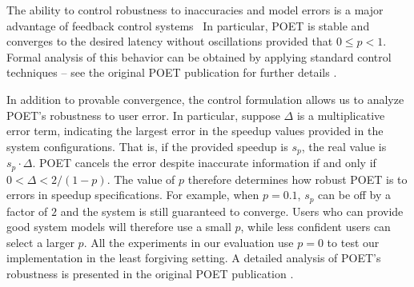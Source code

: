 The ability to control robustness to inaccuracies and model errors is a major advantage of feedback control systems~\cite{ICSE2014}
In particular, POET is stable and converges to the desired latency without oscillations provided that $0 \le p < 1$.
Formal analysis of this behavior can be obtained by applying standard control techniques -- see the original POET publication for further details \cite{POET}.

In addition to provable convergence, the control formulation allows us to analyze POET's robustness to user error.
In particular, suppose $\Delta$ is a multiplicative error term, indicating the largest error in the speedup values provided in the system configurations.
That is, if the provided speedup is $s_p$, the real value is $s_p \cdot \Delta$.
POET cancels the error despite inaccurate information if and only if $0 < \Delta < 2/(1-p)$.
The value of $p$ therefore determines how robust POET is to errors in speedup specifications.
For example, when $p = 0.1$, $s_p$ can be off by a factor of $2$ and the system is still guaranteed to converge.
Users who can provide good system models will therefore use a small $p$, while less confident users can select a larger $p$.
All the experiments in our evaluation use $p=0$ to test our implementation in the least forgiving setting.
A detailed analysis of POET's robustness is presented in the original POET publication \cite{POET}.
